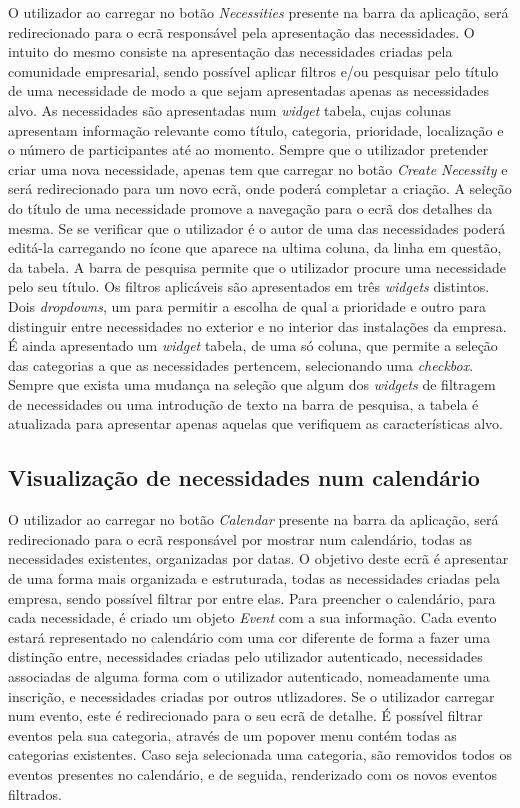 O utilizador ao carregar no botão \textit{Necessities} presente na barra da aplicação, será redirecionado para o ecrã responsável pela apresentação das necessidades. 
O intuito do mesmo consiste na apresentação das necessidades criadas pela comunidade empresarial, sendo possível aplicar filtros e/ou pesquisar pelo título de uma necessidade de modo a que sejam apresentadas apenas as necessidades alvo.
As necessidades são apresentadas num \textit{widget} tabela, cujas colunas apresentam informação relevante como título, categoria, prioridade, localização e o número de participantes até ao momento. Sempre que o utilizador pretender criar uma nova necessidade, apenas tem que carregar no botão \textit{Create Necessity} e será redirecionado para um novo ecrã, onde poderá completar a criação.
A seleção do título de uma necessidade promove a navegação para o ecrã dos detalhes da mesma. Se se verificar que o utilizador é o autor de uma das necessidades poderá editá-la carregando no ícone que aparece na ultima coluna, da linha em questão, da tabela.
A barra de pesquisa permite que o utilizador procure uma necessidade pelo seu título.
Os filtros aplicáveis são apresentados em três \textit{widgets} distintos. Dois \textit{dropdowns}, um para permitir a escolha de qual a prioridade e outro para distinguir entre necessidades no exterior e no interior das instalações da empresa.
É ainda apresentado um \textit{widget} tabela, de uma só coluna, que permite a seleção das categorias a que as necessidades pertencem, selecionando uma \textit{checkbox}.  
Sempre que exista uma mudança na seleção que algum dos \textit{widgets} de filtragem de necessidades ou uma introdução de texto na barra de pesquisa, a tabela é atualizada para apresentar apenas aquelas que verifiquem as características alvo. 

\subsection{Visualização de necessidades num calendário}\label{sec:calendarNecessitiesView}
O utilizador ao carregar no botão \textit{Calendar} presente na barra da aplicação, será redirecionado para o ecrã responsável por mostrar num calendário, todas as necessidades existentes, organizadas por datas. 
O objetivo deste ecrã é apresentar de uma forma mais organizada e estruturada, todas as necessidades criadas pela empresa, sendo possível filtrar por entre elas. 
Para preencher o calendário, para cada necessidade, é criado um objeto \textit{Event} com a sua informação. 
Cada evento estará representado no calendário com uma cor diferente de forma a fazer uma distinção entre, necessidades criadas pelo utilizador autenticado, necessidades associadas de alguma forma com o utilizador autenticado, nomeadamente uma inscrição, e necessidades criadas por outros utlizadores.
Se o utilizador carregar num evento, este é redirecionado para o seu ecrã de detalhe. 
É possível filtrar eventos pela sua categoria, através de um popover menu contém todas as categorias existentes. 
Caso seja selecionada uma categoria, são removidos todos os eventos presentes no calendário, e de seguida, renderizado com os novos eventos filtrados.

